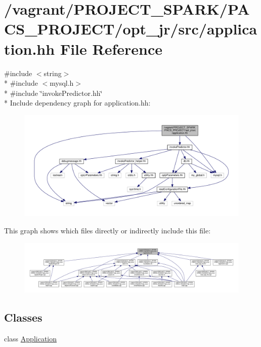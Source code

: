 \hypertarget{application_8hh}{\section{/vagrant/\-P\-R\-O\-J\-E\-C\-T\-\_\-\-S\-P\-A\-R\-K/\-P\-A\-C\-S\-\_\-\-P\-R\-O\-J\-E\-C\-T/opt\-\_\-jr/src/application.hh File Reference}
\label{application_8hh}
}
{\ttfamily \#include $<$string$>$}\\*
{\ttfamily \#include $<$mysql.\-h$>$}\\*
{\ttfamily \#include \char`\"{}invoke\-Predictor.\-hh\char`\"{}}\\*
Include dependency graph for application.\-hh\-:
\nopagebreak
\begin{figure}[H]
\begin{center}
\leavevmode
\includegraphics[width=350pt]{application_8hh__incl}
\end{center}
\end{figure}
This graph shows which files directly or indirectly include this file\-:
\nopagebreak
\begin{figure}[H]
\begin{center}
\leavevmode
\includegraphics[width=350pt]{application_8hh__dep__incl}
\end{center}
\end{figure}
\subsection*{Classes}
\begin{DoxyCompactItemize}
\item 
class \hyperlink{classApplication}{Application}
\end{DoxyCompactItemize}
